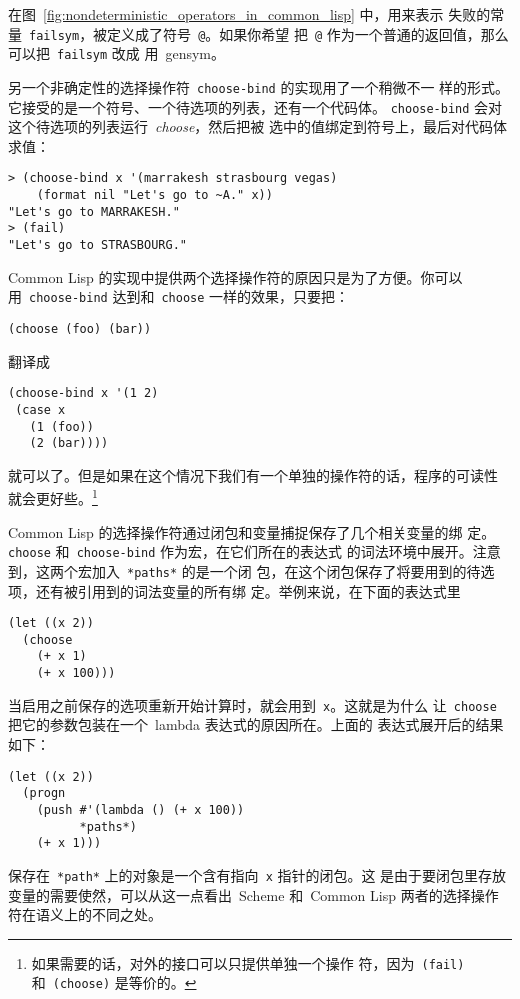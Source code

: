在图~\ref{fig:nondeterministic_operators_in_common_lisp} 中，用来表示
失败的常量~\texttt{failsym}，被定义成了符号~\texttt{@}。如果你希望
把~\texttt{@} 作为一个普通的返回值，那么可以把~\texttt{failsym} 改成
用~gensym。

另一个非确定性的选择操作符~\texttt{choose-bind} 的实现用了一个稍微不一
样的形式。它接受的是一个符号、一个待选项的列表，还有一个代码体。
\texttt{choose-bind} 会对这个待选项的列表运行~\emph{choose}，然后把被
选中的值绑定到符号上，最后对代码体求值：
\begin{lstlisting}
> (choose-bind x '(marrakesh strasbourg vegas)
    (format nil "Let's go to ~A." x))
"Let's go to MARRAKESH."
> (fail)
"Let's go to STRASBOURG."
\end{lstlisting}

Common Lisp 的实现中提供两个选择操作符的原因只是为了方便。你可以
用~\texttt{choose-bind} 达到和~\texttt{choose} 一样的效果，只要把：
\begin{lstlisting}
(choose (foo) (bar))
\end{lstlisting}
翻译成
\begin{lstlisting}
(choose-bind x '(1 2)
 (case x
   (1 (foo))
   (2 (bar))))
\end{lstlisting}
就可以了。但是如果在这个情况下我们有一个单独的操作符的话，程序的可读性
就会更好些。\footnote{如果需要的话，对外的接口可以只提供单独一个操作
  符，因为~\texttt{(fail)} 和~\texttt{(choose)} 是等价的。}

Common Lisp 的选择操作符通过闭包和变量捕捉保存了几个相关变量的绑
定。\texttt{choose} 和~\texttt{choose-bind} 作为宏，在它们所在的表达式
的词法环境中展开。注意到，这两个宏加入~\texttt{*paths*} 的是一个闭
包，在这个闭包保存了将要用到的待选项，还有被引用到的词法变量的所有绑
定。举例来说，在下面的表达式里
\begin{lstlisting}
(let ((x 2))
  (choose
    (+ x 1)
    (+ x 100)))
\end{lstlisting}

当启用之前保存的选项重新开始计算时，就会用到~\texttt{x}。这就是为什么
让~\texttt{choose} 把它的参数包装在一个~lambda 表达式的原因所在。上面的
表达式展开后的结果如下：
\begin{lstlisting}
(let ((x 2))
  (progn
    (push #'(lambda () (+ x 100))
          *paths*)
    (+ x 1)))
\end{lstlisting}

保存在~\texttt{*path*} 上的对象是一个含有指向~\texttt{x} 指针的闭包。这
是由于要闭包里存放变量的需要使然，可以从这一点看出~Scheme 和~Common
Lisp 两者的选择操作符在语义上的不同之处。


